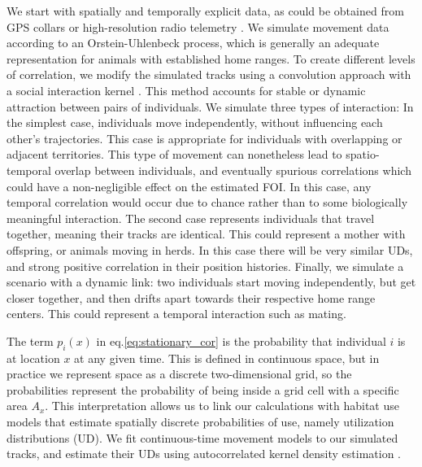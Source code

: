 \documentclass[letterpaper]{article}
\begin{document}
We start with spatially and temporally explicit data, as could be obtained from GPS collars or high-resolution radio telemetry \citep{Aspillaga2021}. We simulate movement data according to an Orstein-Uhlenbeck process, which is generally an adequate representation for animals with established home ranges. To create different levels of correlation, we modify the simulated tracks using a convolution approach with a social interaction kernel \citep{Scharf2018}. This method accounts for stable or dynamic attraction between pairs of individuals. We simulate three types of interaction: 
In the simplest case, individuals move independently, without influencing each other's trajectories. This case is appropriate for individuals with overlapping or adjacent territories. This type of movement can nonetheless lead to spatio-temporal overlap between individuals, and eventually spurious correlations which could have a non-negligible effect on the estimated FOI. 
In this case, any temporal correlation would occur due to chance rather than to some biologically meaningful interaction. 
The second case represents individuals that travel together, meaning their tracks are identical. This could represent a mother with offspring, or animals moving in herds. In this case there will be very similar UDs, and strong positive correlation in their position histories. 
Finally, we simulate a scenario with a dynamic link: two individuals start moving independently, but  get closer together, and then drifts apart towards their respective home range centers. This could represent a temporal interaction such as mating.

The term $p_i(x)$ in eq.\ref{eq:stationary_cor} is the probability that individual $i$ is at location $x$ at any given time. This is defined in continuous space, but in practice we represent space as a discrete two-dimensional grid, so the probabilities represent the probability of being inside a grid cell with a specific area $A_x$. This interpretation allows us to link our calculations with habitat use models that estimate spatially discrete probabilities of use, namely utilization distributions (UD). We fit continuous-time movement models to our simulated tracks, and estimate their UDs using autocorrelated kernel density estimation \citep{Calabrese2016}.
\end{document}
